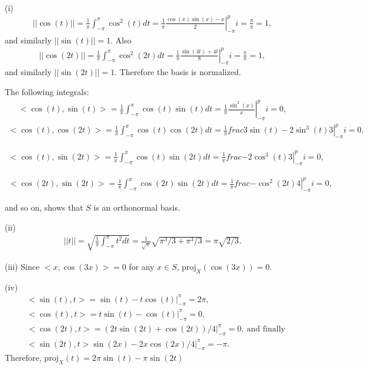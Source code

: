 \documentclass[letterpaper,12pt]{article}
\theoremstyle{definition}
\newenvironment{problem}[2][Problem]{\begin{trivlist}
\item[\hskip \labelsep {\bfseries #1}\hskip \labelsep {\bfseries #2.}]}{\end{trivlist}}
\begin{document}
\begin{problem}8~\\
(i)
\begin{align*}
    ||\cos(t)||=\frac{1}{\pi}\int_{-\pi}^\pi\cos^2(t)dt=
    \frac{1}{\pi}\left.\frac{\cos(x)\sin(x)-x}{2}\right\lvert_{-\pi}^pi=\frac{\pi}{\pi}=1,
\end{align*}
and similarly $||\sin(t)||=1$.
Also
\begin{align*}
    ||\cos(2t)||=\frac{1}{\pi}\int_{-\pi}^\pi\cos^2(2t)dt=
    \frac{1}{\pi}\left.\frac{\sin(4t)+4t}{8}\right\lvert_{-\pi}^pi=\frac{\pi}{\pi}=1,
\end{align*}
and similarly $||\sin(2t)||=1$.
Therefore the basis is normalized.

The following integrals:
\begin{align*}
    <\cos(t),\sin(t)> = \frac{1}{\pi}\int_{-\pi}^\pi\cos(t)\sin(t)dt=
    \frac{1}{\pi}\left.\frac{\sin^2(x)}{x}\right\lvert_{-\pi}^pi=0,
\end{align*}
\newpage
\begin{align*}
    <\cos(t),\cos(2t)> = \frac{1}{\pi}\int_{-\pi}^\pi\cos(t)\cos(2t)dt=
    \frac{1}{\pi}\left.frac{3\sin(t)-2\sin^3(t)}{3}\right\lvert_{-\pi}^pi=0,
\end{align*}

\begin{align*}
    <\cos(t),\sin(2t)> = \frac{1}{\pi}\int_{-\pi}^\pi\cos(t)\sin(2t)dt=
    \frac{1}{\pi}\left.frac{-2\cos^3(t)}{3}\right\lvert_{-\pi}^pi=0,
\end{align*}

\begin{align*}
    <\cos(2t),\sin(2t)> = \frac{1}{\pi}\int_{-\pi}^\pi\cos(2t)\sin(2t)dt=
    \frac{1}{\pi}\left.frac{-\cos^2(2t)}{4}\right\lvert_{-\pi}^pi=0,
\end{align*}

and so on, shows that $S$ is an orthonormal basis.

(ii)
\begin{align*}
    ||t|| = \sqrt{\frac{1}{\pi}\int_{-\pi}^\pi t^2dt}=
    \frac{1}{\sqrt{\pi}}\sqrt{\pi^3/3+\pi^3/3}=
    \pi\sqrt{2/3}.
\end{align*}

(iii)
Since $<x,\cos(3x)>=0$ for any $x\in S$, $\text{proj}_X(\cos(3x))=0$.

(iv)
\begin{align*}
    &<\sin(t),t>=\sin(t)-t\cos(t)\lvert_{-\pi}^\pi=2\pi,\\
    &<\cos(t),t>=t\sin(t)-\cos(t)\lvert_{-\pi}^\pi=0,\\
    &<\cos(2t),t>=(2t\sin(2t)+\cos(2t))/4\lvert_{-\pi}^\pi=0,\ \text{and finally}\\
    &<\sin(2t),t>\sin\left(2x\right)-2x\cos\left(2x\right)/4\lvert_{-\pi}^\pi=-\pi.
\end{align*}
Therefore, $\text{proj}_X(t)=2\pi\sin(t)-\pi\sin(2t)$

\end{problem}
\end{document}
